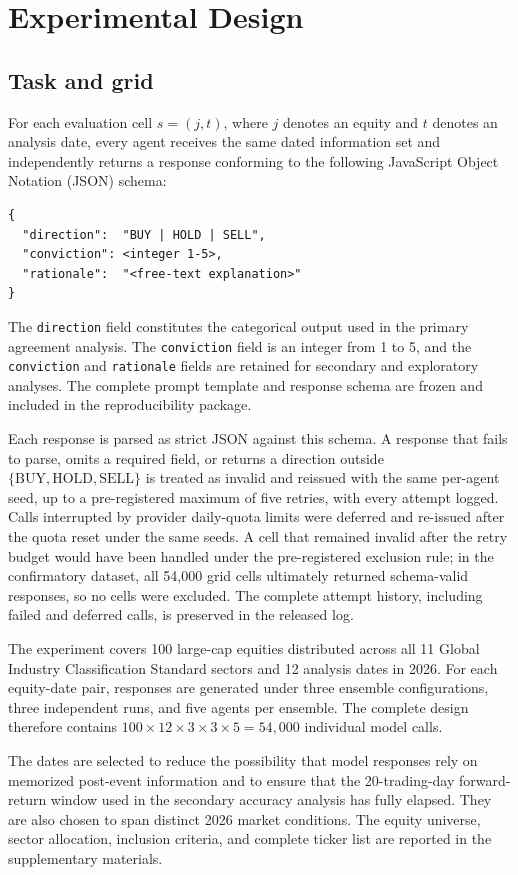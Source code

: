 \documentclass{ieeeaccess}
\begin{document}
\section{Experimental Design}
\subsection{Task and grid}
For each evaluation cell $s=(j,t)$, where $j$ denotes an equity and $t$ denotes
an analysis date, every agent receives the same dated information set and
independently returns a response conforming to the following JavaScript Object
Notation (JSON) schema:
\begin{lstlisting}
{
  "direction":  "BUY | HOLD | SELL",
  "conviction": <integer 1-5>,
  "rationale":  "<free-text explanation>"
}
\end{lstlisting}
The \texttt{direction} field constitutes the categorical output used in the
primary agreement analysis. The \texttt{conviction} field is an integer from 1
to 5, and the \texttt{conviction} and \texttt{rationale} fields are retained for
secondary and exploratory analyses. The complete prompt template and response
schema are frozen and included in the reproducibility package.

Each response is parsed as strict JSON against this schema. A response that
fails to parse, omits a required field, or returns a direction outside
$\{\mathrm{BUY},\mathrm{HOLD},\mathrm{SELL}\}$ is treated as invalid and
reissued with the same per-agent seed, up to a pre-registered maximum of five
retries, with every attempt logged. Calls interrupted by provider daily-quota
limits were deferred and re-issued after the quota reset under the same seeds. A
cell that remained invalid after the retry budget would have been handled under
the pre-registered exclusion rule; in the confirmatory dataset, all 54{,}000
grid cells ultimately returned schema-valid responses, so no cells were
excluded. The complete attempt history, including failed and deferred calls, is
preserved in the released log.

The experiment covers 100 large-cap equities distributed across all 11 Global
Industry Classification Standard sectors and 12 analysis dates in 2026. For
each equity-date pair, responses are generated under three ensemble
configurations, three independent runs, and five agents per ensemble. The
complete design therefore contains
$100\times 12\times 3\times 3\times 5=54{,}000$ individual model calls.

The dates are selected to reduce the possibility that model responses rely on
memorized post-event information and to ensure that the 20-trading-day
forward-return window used in the secondary accuracy analysis has fully elapsed.
They are also chosen to span distinct 2026 market conditions. The equity
universe, sector allocation, inclusion criteria, and complete ticker list are
reported in the supplementary materials.
\end{document}
